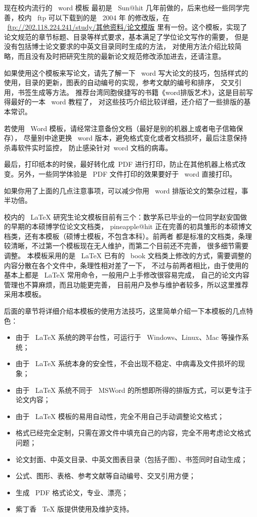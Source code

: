  现在校内流行的~ word 模板
最初是~ Sun@hit 几年前做的，后来也经一些同学完善，校内~ ftp
可以下载到的是~ 2004 年 的修改版，在
~\href{ftp://202.118.224.241/study/\%C6\%E4\%CB\%FB\%D7\%CA\%C1\%CF/\%C2\%DB\%CE\%C4\%C4\%A3\%B0\%E6}{ftp://202.118.224.241/study/其他资料/论文模版}
里有一份。这个模板，实现了论文规范的章节标题、目录等样式要求，基本满足了学位论文写作的需要，
但是没有包括博士论文要求的中英文目录同时生成的方法，
对使用方法介绍比较简略，而且没有及时把研究生院的最新论文规范修改添加进去，还请注意。

如果使用这个模板来写论文，请先了解一下~ word 写大论文的技巧，包括样式的使用，目录的更新，图表的自动编号的实现，参考文献的编号和排序，
交叉引用，书签生成等方法。 推荐台湾同胞侯捷写的书籍《word排版艺术》，这是目前写得最好的一本~ word 教程了，
对这些技巧介绍比较详细，还介绍了一些排版的基本常识。

若使用~ Word 模板，请经常注意备份文档（最好是别的机器上或者电子信箱保存），
尽量别中途更换~ word 版本，避免格式变化或者文档损坏，最后注意保持杀毒软件实时监控，
防止感染针对~word 文档的病毒。

最后，打印纸本的时侯，最好转化成~PDF 进行打印，防止在其他机器上格式改变。另外，一些同学体验是~ PDF 文件打印的效果要好于~ word 直接打印。

如果你用了上面的几点注意事项，可以减少你用~ word 排版论文的繁杂过程，事半功倍。

校内的~ LaTeX
研究生论文模板目前有三个：数学系已毕业的一位同学赵安国做的早期的本硕博学位论文文档类，
pineapple@hit
正在完善的初具雏形的本硕博文档类，还有本模板（硕博士模板，不包含本科）。前两者
都是标准的文档类，条理较清晰，不过第一个模板现在无人维护，而第二个目前还不完善，
很多细节需要调整。 本模板采用的是~ LaTeX 已有的~ book
文档类上修改的方式，需要调整的内容分散在各个文件中，条理性相对差了一下，
不过与前两者相比，由于使用的基本上都是~ LaTeX 常用命令，一般用户上手修改很容易完成，
自己的论文内容管理也不算麻烦，而且功能更完善，
目前用户及参与维护者较多，所以这里推荐采用本模板。

后面的章节将详细介绍本模板的使用方法技巧，这里简单介绍一下本模板的几点特色：
\begin{itemize}
  \item 由于~ LaTeX 系统的跨平台性，可运行于~ Windows、Linux、Mac 等操作系统；
  \item 由于~ LaTeX 系统本身的安全性，不会出现不稳定、中病毒及文件损坏的现象；
  \item 由于 ~LaTeX 系统不同于~ MSWord 的所想即所得的排版方式，可以更专注于论文内容；
  \item 由于~ LaTeX 模板的易用自动性，完全不用自己手动调整论文格式；
  \item 格式已经完全定制，只需在源文件中填充自己的内容，完全不用考虑论文格式问题；
  \item 论文封面、中英文目录、中英文图表目录（包括子图）、书签同时自动生成；
  \item 公式、图形、表格、参考文献等自动编号、交叉引用方便；
  \item 生成 ~PDF 格式论文，专业、漂亮；
  \item 紫丁香 ~TeX 版提供使用及维护支持。
\end{itemize}

